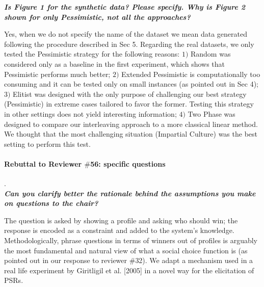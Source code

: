 \documentclass{article}
\begin{document}

\textit{\textbf{Is Figure 1 for the synthetic data? Please specify. Why is Figure 2 shown for only Pessimistic, not all the approaches?}}

Yes, when we do not specify the name of the dataset we mean data generated following the procedure described in Sec 5. Regarding the real datasets, we only tested the Pessimistic strategy for the following reasons: $1)$ Random was considered only as a baseline in the first experiment, which shows that Pessimistic performs much better; $2)$ Extended Pessimistic is computationally too consuming and it can be tested only on small instances (as pointed out in Sec 4); $3)$ Elitist was designed with the only purpose of challenging our best strategy (Pessimistic) in extreme cases tailored to favor the former. Testing this strategy in other settings does not yield interesting information; $4)$ Two Phase was designed to compare our interleaving approach to a more classical linear method. We thought that the most challenging situation (Impartial Culture) was the best setting to perform this test.



\paragraph{Rebuttal to Reviewer $\#$56: specific questions}.\\
\textit{\textbf{Can you clarify better the rationale behind the assumptions you make on questions to the chair?}}

The question is asked by showing a profile and asking who should win; the response is encoded as a constraint and added to the system’s knowledge. Methodologically, phrase questions in terms of winners out of profiles is arguably the most fundamental and natural view of what a social choice function is (as pointed out in our response to reviewer $\#$32). We adapt a mechanism used in a real life experiment by Giritligil et al. [2005] in a novel way for the elicitation of PSRs.
\end{document}
